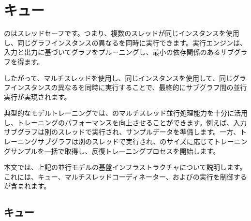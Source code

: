 \begin{savequote}[45mm]
\end{savequote}

\chapter{キュー} 
\label{ch:queue}

\begin{content}

のはスレッドセーフです。つまり、複数のスレッドが同じインスタンスを使用し、同じグラフインスタンスの異なるを同時に実行できます。実行エンジンは、入力と出力に基づいてグラフをプルーニングし、最小の依存関係のあるサブグラフを得ます。

したがって、マルチスレッドを使用し、同じインスタンスを使用して、同じグラフインスタンスの異なるを同時に実行することで、最終的にサブグラフ間の並行実行が実現されます。

典型的なモデルトレーニングでは、のマルチスレッド並行処理能力を十分に活用し、トレーニングのパフォーマンスを向上させることができます。例えば、入力サブグラフは別のスレッドで実行され、サンプルデータを準備します。一方、トレーニングサブグラフは別のスレッドで実行され、のサイズに応じてトレーニングサンプルを一括で取得し、反復トレーニングプロセスを開始します。

本文では、上記の並行モデルの基盤インフラストラクチャについて説明します。これには、キュー、マルチスレッドコーディネーター、およびの実行を制御するが含まれます。

\end{content}

\section{キュー}


